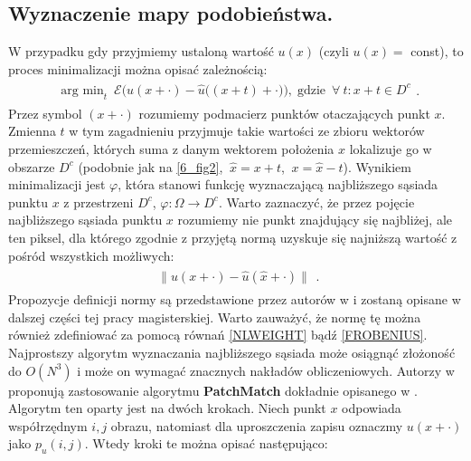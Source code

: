 \documentclass[a4paper,12pt,twoside,openany]{report}
\begin{document}
\subsection{Wyznaczenie mapy podobieństwa.}
\label{ssec:wyznaczanieMapySection}
W przypadku gdy przyjmiemy ustaloną wartość $u(x)$ (czyli $u(x) = $ const), to proces minimalizacji można opisać zależnością:
\begin{align}
\begin{aligned}
\mathop{\operatorname{arg \ min}}_{t} \ \mathcal{E}\biggl( u(x+\cdot) - {\hat{u}}\bigl((x+t)+\cdot\bigr)\biggr),\operatorname{gdzie} \ \forall \ t : x+t \in D^c
\label{minNNF}
\end{aligned}
.
\end{align}
Przez symbol $(x+\cdot)$ rozumiemy podmacierz punktów otaczających punkt $x$. 
Zmienna $t$ w tym zagadnieniu przyjmuje takie wartości ze zbioru wektorów przemieszczeń, których suma z danym wektorem położenia $x$ lokalizuje go w obszarze $D^c$ (podobnie jak na \autoref{6_fig2}, $ \ \hat{x} = x + t$, $ \ x = \hat{x} - t$). Wynikiem minimalizacji jest $\varphi$, która stanowi funkcję wyznaczającą najbliższego sąsiada punktu $x$ z przestrzeni $D^c$, $\varphi :\Omega \rightarrow D^c$. Warto zaznaczyć, że przez pojęcie najbliższego sąsiada punktu $x$ rozumiemy nie punkt znajdujący się najbliżej, ale ten piksel, dla którego zgodnie z przyjętą normą uzyskuje się najniższą wartość z pośród wszystkich możliwych:
\begin{align}
\begin{aligned}
\big\| u(x + \cdot) - \hat{u}(\hat{x}+\cdot) \big\| 
\label{normNNF}
\end{aligned}
.
\end{align}
Propozycje definicji normy są przedstawione przez autorów w \cite{MathematicalModelsforNLTextureInpainting} i zostaną opisane w dalszej części tej pracy magisterskiej. Warto zauważyć, że normę tę można również zdefiniować za pomocą równań \eqref{NLWEIGHT} bądź \eqref{FROBENIUS}. Najprostszy algorytm wyznaczania najbliższego sąsiada może osiągnąć złożoność do $O(N^3)$ i może on wymagać znacznych nakładów obliczeniowych. Autorzy w \cite{arias2011variational} proponują zastosowanie algorytmu \textbf{PatchMatch} dokładnie opisanego w \cite{barnes2009patchmatch}. Algorytm ten oparty jest na dwóch krokach. Niech punkt $x$ odpowiada współrzędnym $i, j$ obrazu, natomiast dla uproszczenia zapisu oznaczmy $u(x+\cdot)$ jako $p_u(i,j)$. Wtedy kroki te można opisać następująco:
\end{document}
